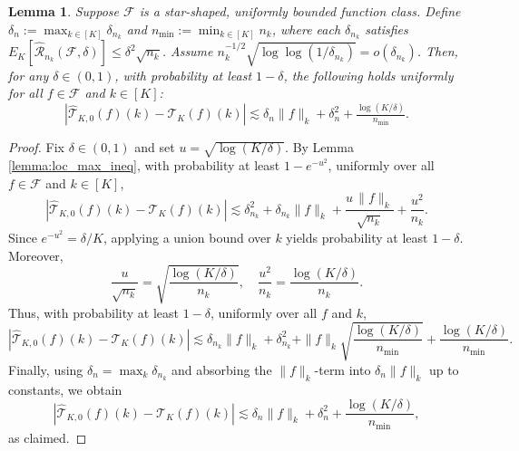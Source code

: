 \documentclass[11pt]{article}
\theoremstyle{plain}
\newtheorem{lemma}{Lemma}
\theoremstyle{definition}
\theoremstyle{remark}
\theoremstyle{definition}
\begin{document}
\begin{lemma}
\label{lemma::localmax1}
Suppose \(\mathcal{F}\) is a star-shaped, uniformly bounded function class. Define \(\delta_n := \max_{k \in [K]} \delta_{n_k}\) and \(n_{\min} := \min_{k \in [K]} n_k\), where each \(\delta_{n_k}\) satisfies \(E_K[\widehat{\mathcal{R}}_{n_k}(\mathcal{F}, \delta)] \le \delta^2\sqrt{n_k}\). Assume \(n_k^{-1/2}\sqrt{\log\log(1/\delta_{n_k})} = o(\delta_{n_k})\). Then, for any \(\delta \in (0,1)\), with probability at least \(1 - \delta\), the following holds uniformly for all \(f \in \mathcal{F}\) and \(k \in [K]\):
\[
|\widehat{\mathcal{T}}_{K,0}(f)(k) - \mathcal{T}_K(f)(k)| \lesssim \delta_n\|f\|_k + \delta_n^2 + \tfrac{\log(K/\delta)}{n_{\min}}.
\]
\end{lemma}
\begin{proof}
Fix \(\delta \in (0,1)\) and set \(u = \sqrt{\log(K/\delta)}\). By Lemma \ref{lemma:loc_max_ineq}, with probability at least \(1 - e^{-u^2}\), uniformly over all \(f \in \mathcal{F}\) and \(k \in [K]\),
\[
|\widehat{\mathcal{T}}_{K,0}(f)(k) - \mathcal{T}_K(f)(k)| \lesssim \delta_{n_k}^2 + \delta_{n_k}\|f\|_k + \frac{u\,\|f\|_k}{\sqrt{n_k}} + \frac{u^2}{n_k}.
\]
Since \(e^{-u^2} = \delta/K\), applying a union bound over \(k\) yields probability at least \(1 - \delta\). Moreover,
\[
\frac{u}{\sqrt{n_k}} = \sqrt{\frac{\log(K/\delta)}{n_k}}, \quad \frac{u^2}{n_k} = \frac{\log(K/\delta)}{n_k}.
\]
Thus, with probability at least \(1 - \delta\), uniformly over all \(f\) and \(k\),
\[
|\widehat{\mathcal{T}}_{K,0}(f)(k) - \mathcal{T}_K(f)(k)| \lesssim \delta_{n_k}\|f\|_k + \delta_{n_k}^2 + \|f\|_k\sqrt{\frac{\log(K/\delta)}{n_{\min}}} + \frac{\log(K/\delta)}{n_{\min}}.
\]
Finally, using \(\delta_n = \max_k \delta_{n_k}\) and absorbing the \(\|f\|_k\)-term into \(\delta_n\|f\|_k\) up to constants, we obtain
\[
|\widehat{\mathcal{T}}_{K,0}(f)(k) - \mathcal{T}_K(f)(k)| \lesssim \delta_n\|f\|_k + \delta_n^2 + \frac{\log(K/\delta)}{n_{\min}},
\]
as claimed.
\end{proof}



 




\end{document}
